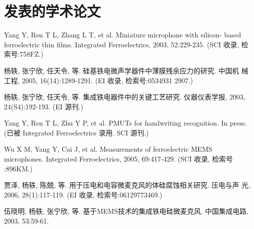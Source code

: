 \begin{resume}
\begin{refsection}
    \printbibliography[heading=subbibliography,title={发表的学术论文}]
	\end{refsection}

	\begin{refsection}
	\nocite{ref-8-1-任天令,ref-9-1-Ren}%
	\printbibliography[heading=subbibliography,title={申请的发明专利}]
	\end{refsection}


	\begin{refsection}
	\nocite{比赛2021}%
	\printbibliography[heading=subbibliography,title={获得的竞赛奖项}]
	\end{refsection}

	\begin{refsection}
	\nocite{国自科2024}%
	\printbibliography[heading=subbibliography,title={参与的科研项目}]
	\end{refsection}
\endgroup


\else

  \section*{发表的学术论文} %

  \begin{enumerate}[label={[\arabic*]},labelsep=6pt,topsep=0pt,partopsep=0pt,
parsep=0pt,itemsep=1pt,leftmargin=0em,itemindent=42pt]
  \item Yang Y, Ren T L, Zhang L T, et al. Miniature microphone with silicon-
    based ferroelectric thin films. Integrated Ferroelectrics, 2003,
    52:229-235. (SCI 收录, 检索号:758FZ.)
  \item 杨轶, 张宁欣, 任天令, 等. 硅基铁电微声学器件中薄膜残余应力的研究. 中国机
    械工程, 2005, 16(14):1289-1291. (EI 收录, 检索号:0534931 2907.)
  \item 杨轶, 张宁欣, 任天令, 等. 集成铁电器件中的关键工艺研究. 仪器仪表学报,
    2003, 24(S4):192-193. (EI 源刊.)
  \item Yang Y, Ren T L, Zhu Y P, et al. PMUTs for handwriting recognition. In
    press. (已被 Integrated Ferroelectrics 录用. SCI 源刊.)
  \item Wu X M, Yang Y, Cai J, et al. Measurements of ferroelectric MEMS
    microphones. Integrated Ferroelectrics, 2005, 69:417-429. (SCI 收录, 检索号
    :896KM.)
  \item 贾泽, 杨轶, 陈兢, 等. 用于压电和电容微麦克风的体硅腐蚀相关研究. 压电与声
    光, 2006, 28(1):117-119. (EI 收录, 检索号:06129773469.)
  \item 伍晓明, 杨轶, 张宁欣, 等. 基于MEMS技术的集成铁电硅微麦克风. 中国集成电路,
    2003, 53:59-61.
  \end{enumerate}


\end{resume}

